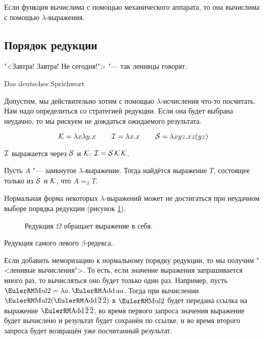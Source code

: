 \begin{theorem}
    Если функция вычислима с помощью механического аппарата, то она вычислима с помощью $\lambda$-выражения.
\end{theorem}

\subsection{\texorpdfstring{Порядок редукции}{Order of reduction}}
\epigraph{"<Завтра! Завтра! Не сегодня!"> "--- так ленивцы говорят.}{Das deutsches Sprichwort}

Допустим, мы действительно хотим с помощью $\lambda$-исчисления что-то посчитать.
Нам надо определиться со стратегией редукции. Если она будет выбрана неудачно, то мы рискуем не дождаться ожидаемого результата.

\begin{definition}
\[
    \operatorname{\mathcal{K}} = \lambda x \lambda y . x \qquad
    \operatorname{\mathcal{I}} = \lambda x . x \qquad
    \operatorname{\mathcal{S}} = \lambda x y z . x z (y z)
\]
\end{definition}
$\operatorname{\mathcal{I}}$ выражается через $\operatorname{\mathcal{S}}$ и $\operatorname{\mathcal{K}}$: $\operatorname{\mathcal{I}} = \operatorname{\mathcal{S}} \operatorname{\mathcal{K}} \operatorname{\mathcal{K}}$.

\begin{statement} \label{SK-basis}
    Пусть $A$ "--- замкнутое $\lambda$-выражение.
    Тогда найдётся выражение $T$, состоящее только из $\operatorname{\mathcal{S}}$ и $\operatorname{\mathcal{K}}$, что $A =_{\beta}T$.
\end{statement}

Нормальная форма некоторых $\lambda$-выражений может не достигаться при неудачном выборе порядка редукции (рисунок \ref{infred}).
\begin{figure}[ht]
\centering
{}
\caption{Редукция $\Omega$ обращает выражение в себя.}
\label{infred}
\end{figure}

\begin{definition}
    Редукция самого левого $\beta$-редекса.
\end{definition}
Если добавить меморизацию к нормальному порядку редукции, то мы получим "<ленивые вычисления">.
То есть, если значение выражения запрашивается много раз, то вычисляться оно будет только один раз.
Например, пусть $\func{Mul2} = \lambda a . \func{Add} a a$.
Тогда при вычислении $\func{Mul2} (\func{Add} \mathinner{\overline 2} \overline 2)$ в $\func{Mul2}$ будет передана ссылка
на выражение $\func{Add} \mathinner{\overline 2} \overline 2$,
во время первого запроса значения выражение будет вычислено и результат будет сохранён по ссылке,
и во время второго запроса будет возвращён уже посчитанный результат.

